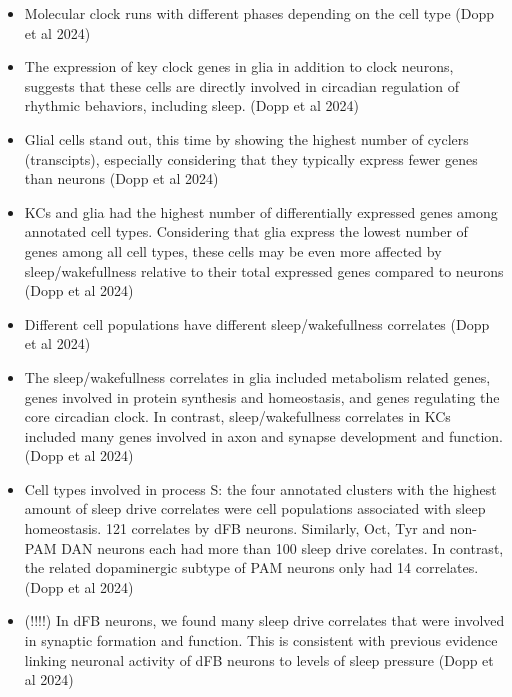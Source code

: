 \documentclass[11pt]{article}
\begin{document}
\begin{itemize}
    \item Molecular clock runs with different phases depending on the cell type \cite{doppSinglecellTranscriptomicsReveals2024}
    (Dopp et al 2024)
    
    \item The expression of key clock genes in glia in addition to clock neurons, suggests that these cells are directly
    involved in circadian regulation of rhythmic behaviors, including sleep. \cite{doppSinglecellTranscriptomicsReveals2024}
    (Dopp et al 2024)

    \item Glial cells stand out, this time by showing the highest number of cyclers (transcipts), especially considering that
    they typically express fewer genes than neurons \cite{doppSinglecellTranscriptomicsReveals2024}
    (Dopp et al 2024)

    \item KCs and glia had the highest number of differentially expressed genes among annotated cell types.
    Considering that glia express the lowest number of genes among all cell types, these cells may be even more affected by
    sleep/wakefullness relative to their total expressed genes compared to neurons \cite{doppSinglecellTranscriptomicsReveals2024}
    (Dopp et al 2024)

    \item Different cell populations have different sleep/wakefullness correlates \cite{doppSinglecellTranscriptomicsReveals2024}
    (Dopp et al 2024)

    \item The sleep/wakefullness correlates in glia included metabolism related genes, genes involved in protein synthesis
    and homeostasis, and genes regulating the core circadian clock. In contrast, sleep/wakefullness correlates in KCs included many
    genes involved in axon and synapse development and function.
    (Dopp et al 2024)

    \item Cell types involved in process S: the four annotated clusters with the highest amount of sleep drive correlates
    were cell populations associated with sleep homeostasis. 121 correlates by dFB neurons. Similarly, Oct, Tyr and non-PAM DAN
    neurons each had more than 100 sleep drive corelates. In contrast, the related dopaminergic subtype of PAM neurons only had
    14 correlates.
    (Dopp et al 2024)

    \item (!!!!) In dFB neurons, we found many sleep drive correlates that were involved in synaptic formation and function. This is
    consistent with previous evidence linking neuronal activity of dFB neurons to levels of sleep pressure
    (Dopp et al 2024)


\end{itemize}
\end{document}
